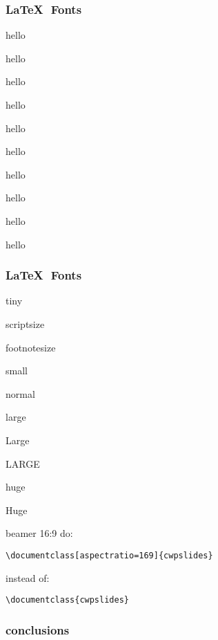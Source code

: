 \begin{frame}\frametitle{\LaTeX$\text{ }$Fonts}
\centering
\tiny hello

\scriptsize hello

\footnotesize hello

\small hello

\normalsize hello

\large hello

\Large hello

\LARGE hello

\huge hello

\centering
\Huge hello

\end{frame}

\begin{frame}\frametitle{\LaTeX$\text{ }$Fonts}
\centering
\tiny tiny

\scriptsize scriptsize

\footnotesize footnotesize

\small small

\normalsize normal

\large large

\Large Large

\LARGE LARGE 

\huge huge

\Huge Huge

\end{frame}


\usebackgroundtemplate{}

\begin{frame}[fragile]{beamer 16:9}
do:
\begin{verbatim}
\documentclass[aspectratio=169]{cwpslides}
\end{verbatim}
instead of:
\begin{verbatim}
\documentclass{cwpslides}
\end{verbatim}

\end{frame}


\begin{frame}\frametitle{conclusions}

\vfill
{}
\vfill
{}
\vfill
{}
\end{frame}
